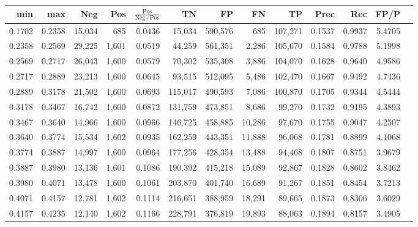 \begin{tabular}{rrrrrrrrrrrrr}
\toprule
   min &    max &    Neg &   Pos & $\frac{\text{Pos}}{\text{Neg}+\text{Pos}}$ &      TN &      FP &      FN &      TP &   Prec &    Rec &   FP/P \\
\midrule
0.1702 & 0.2358 & 15,034 &   685 &                                     0.0436 &  15,034 & 590,576 &     685 & 107,271 & 0.1537 & 0.9937 & 5.4705 \\
0.2358 & 0.2569 & 29,225 & 1,601 &                                     0.0519 &  44,259 & 561,351 &   2,286 & 105,670 & 0.1584 & 0.9788 & 5.1998 \\
0.2569 & 0.2717 & 26,043 & 1,600 &                                     0.0579 &  70,302 & 535,308 &   3,886 & 104,070 & 0.1628 & 0.9640 & 4.9586 \\
0.2717 & 0.2889 & 23,213 & 1,600 &                                     0.0645 &  93,515 & 512,095 &   5,486 & 102,470 & 0.1667 & 0.9492 & 4.7436 \\
0.2889 & 0.3178 & 21,502 & 1,600 &                                     0.0693 & 115,017 & 490,593 &   7,086 & 100,870 & 0.1705 & 0.9344 & 4.5444 \\
0.3178 & 0.3467 & 16,742 & 1,600 &                                     0.0872 & 131,759 & 473,851 &   8,686 &  99,270 & 0.1732 & 0.9195 & 4.3893 \\
0.3467 & 0.3640 & 14,966 & 1,600 &                                     0.0966 & 146,725 & 458,885 &  10,286 &  97,670 & 0.1755 & 0.9047 & 4.2507 \\
0.3640 & 0.3774 & 15,534 & 1,602 &                                     0.0935 & 162,259 & 443,351 &  11,888 &  96,068 & 0.1781 & 0.8899 & 4.1068 \\
0.3774 & 0.3887 & 14,997 & 1,600 &                                     0.0964 & 177,256 & 428,354 &  13,488 &  94,468 & 0.1807 & 0.8751 & 3.9679 \\
0.3887 & 0.3980 & 13,136 & 1,601 &                                     0.1086 & 190,392 & 415,218 &  15,089 &  92,867 & 0.1828 & 0.8602 & 3.8462 \\
0.3980 & 0.4071 & 13,478 & 1,600 &                                     0.1061 & 203,870 & 401,740 &  16,689 &  91,267 & 0.1851 & 0.8454 & 3.7213 \\
0.4071 & 0.4157 & 12,781 & 1,602 &                                     0.1114 & 216,651 & 388,959 &  18,291 &  89,665 & 0.1873 & 0.8306 & 3.6029 \\
0.4157 & 0.4235 & 12,140 & 1,602 &                                     0.1166 & 228,791 & 376,819 &  19,893 &  88,063 & 0.1894 & 0.8157 & 3.4905 \\

\end{tabular}
